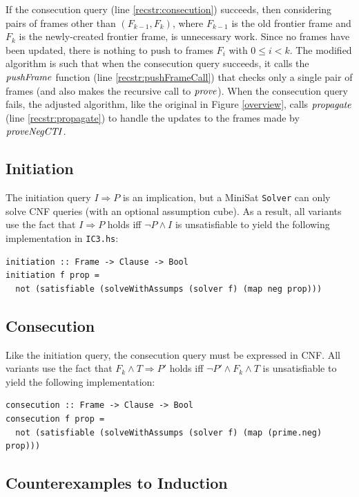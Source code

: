 \documentclass[12pt,a4paper,twoside,openright]{report}
\begin{document}
{{If the consecution query (line \ref{recstr:consecution}) succeeds, then
considering pairs of frames other
than $(F_{k - 1}, F_k)$, where $F_{k - 1}$ is the old frontier frame and $F_k$ is
the newly-created frontier frame, is unnecessary work.
Since no frames have been updated, there is nothing to push to frames $F_i$ with
$0 \leq i < k$.
The modified algorithm is such
that when the consecution query succeeds, it calls the ${\it pushFrame}$ function
(line \ref{recstr:pushFrameCall}) that
checks only a single pair of frames (and also makes the recursive call to ${\it prove}$).
When the consecution query fails, the adjusted algorithm, like the original in Figure \ref{overview},
calls ${\it propagate}$ (line \ref{recstr:propagate})
to handle the updates to the frames made by ${\it proveNegCTI}$.

\subsection{Initiation}

The initiation query $I \Rightarrow P$ is an implication, but a MiniSat \verb,Solver, can only
solve CNF queries (with an optional assumption cube).
As a result, all variants use the fact that
$I \Rightarrow P$ holds iff $\neg P \wedge I$ is unsatisfiable to yield
the following implementation in \verb,IC3.hs,:

\begin{lstlisting}
initiation :: Frame -> Clause -> Bool
initiation f prop =
  not (satisfiable (solveWithAssumps (solver f) (map neg prop)))
\end{lstlisting}

\subsection{Consecution}

Like the initiation query, the consecution query must be expressed in CNF.
All variants use the fact that
$F_k \wedge T \Rightarrow P'$ holds iff $\neg P' \wedge F_k \wedge T$ is unsatisfiable
to yield the following implementation:
\begin{lstlisting}
consecution :: Frame -> Clause -> Bool
consecution f prop =
  not (satisfiable (solveWithAssumps (solver f) (map (prime.neg) prop)))
\end{lstlisting}

\subsection{Counterexamples to Induction}

}}
\end{document}
